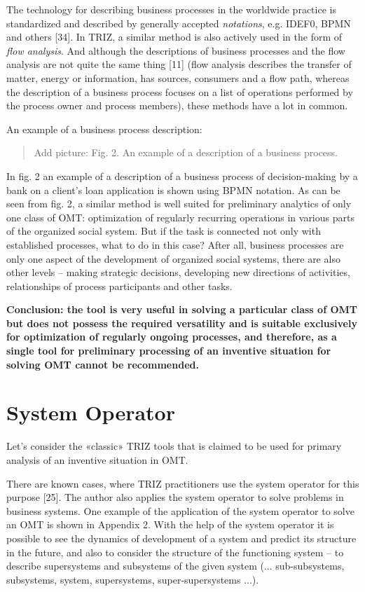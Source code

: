 \documentclass[11pt,a4paper]{book}
\newcommand{\addpicture}[1]{
  \begin{quote} Add picture: #1\end{quote}
}
\begin{document}
The technology for describing business processes in the worldwide practice is
standardized and described by generally accepted \emph{notations}, e.g. IDEF0,
BPMN and others [34]. In TRIZ, a similar method is also actively used in the
form of \emph{flow analysis}. And although the descriptions of business
processes and the flow analysis are not quite the same thing [11] (flow
analysis describes the transfer of matter, energy or information, has sources,
consumers and a flow path, whereas the description of a business process
focuses on a list of operations performed by the process owner and process
members), these methods have a lot in common.

An example of a business process description:

\addpicture{Fig. 2. An example of a description of a business process.}

In fig. 2 an example of a description of a business process of decision-making
by a bank on a client’s loan application is shown using BPMN notation. As can
be seen from fig. 2, a similar method is well suited for preliminary analytics
of only one class of OMT: optimization of regularly recurring operations in
various parts of the organized social system.  But if the task is connected
not only with established processes, what to do in this case? After all,
business processes are only one aspect of the development of organized social
systems, there are also other levels -- making strategic decisions, developing
new directions of activities, relationships of process participants and other
tasks.

\textbf{Conclusion: the tool is very useful in solving a particular class of
  OMT but does not possess the required versatility and is suitable
  exclusively for optimization of regularly ongoing processes, and therefore,
  as a single tool for preliminary processing of an inventive situation for
  solving OMT cannot be recommended.}

\section{System Operator}
Let's consider the «classic» TRIZ tools that is claimed to be used for primary
analysis of an inventive situation in OMT.

There are known cases, where TRIZ practitioners use the system operator for
this purpose [25]. The author also applies the system operator to solve
problems in business systems. One example of the application of the system
operator to solve an OMT is shown in Appendix 2.  With the help of the system
operator it is possible to see the dynamics of development of a system and
predict its structure in the future, and also to consider the structure of the
functioning system -- to describe supersystems and subsystems of the given
system (... sub-subsystems, subsystems, system, supersystems,
super-supersystems ...).
\end{document}

